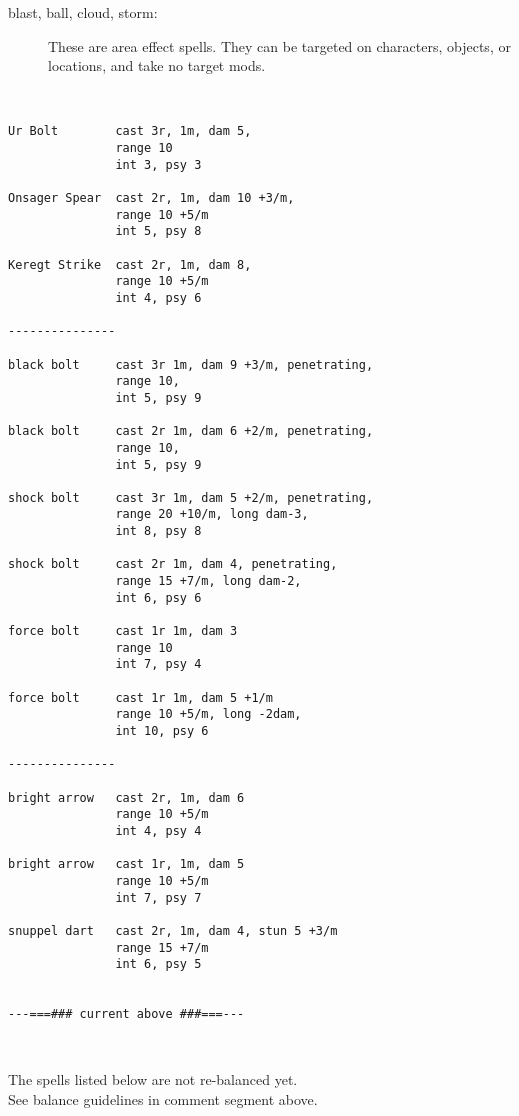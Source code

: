 \begin{description}
\item[blast, ball, cloud, storm:]
These are area effect spells. They can be targeted on characters, objects, or locations, and take no target mods.


\end{description}

\

\small \begin{verbatim}
Ur Bolt        cast 3r, 1m, dam 5,
               range 10
               int 3, psy 3

Onsager Spear  cast 2r, 1m, dam 10 +3/m,
               range 10 +5/m
               int 5, psy 8

Keregt Strike  cast 2r, 1m, dam 8,
               range 10 +5/m
               int 4, psy 6

---------------

black bolt     cast 3r 1m, dam 9 +3/m, penetrating,
               range 10, 
               int 5, psy 9

black bolt     cast 2r 1m, dam 6 +2/m, penetrating,
               range 10,
               int 5, psy 9

shock bolt     cast 3r 1m, dam 5 +2/m, penetrating,
               range 20 +10/m, long dam-3,
               int 8, psy 8

shock bolt     cast 2r 1m, dam 4, penetrating,
               range 15 +7/m, long dam-2,
               int 6, psy 6

force bolt     cast 1r 1m, dam 3
               range 10
               int 7, psy 4

force bolt     cast 1r 1m, dam 5 +1/m
               range 10 +5/m, long -2dam,
               int 10, psy 6

---------------

bright arrow   cast 2r, 1m, dam 6
               range 10 +5/m
               int 4, psy 4

bright arrow   cast 1r, 1m, dam 5
               range 10 +5/m
               int 7, psy 7

snuppel dart   cast 2r, 1m, dam 4, stun 5 +3/m
               range 15 +7/m
               int 6, psy 5


---===### current above ###===---
\end{verbatim} \normalsize

\

\noindent 
The spells listed below are not re-balanced yet.\\
See balance guidelines in comment segment above.

